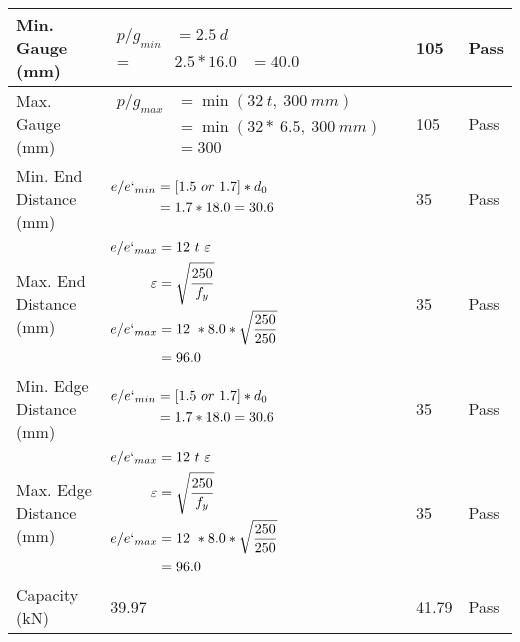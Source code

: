 \documentclass{article}%
\begin{document}
\begin{longtable}{|p{4cm}|p{5cm}|p{5.5cm}|p{1.5cm}|}
\hline%
Min. Gauge (mm)&$\begin{aligned}p/g_{min}&= 2.5 ~ d&\\ =&2.5*16.0&=40.0\end{aligned}$&105&Pass\\%
\hline%
Max. Gauge (mm)&$\begin{aligned}p/g_{max} &=\min(32~t,~300~mm)&\\ &=\min(32 *~6.5,~ 300 ~mm)\\&=300\end{aligned}$&105&Pass\\%
\hline%
Min. End Distance (mm)&$\begin{aligned}e/e`_{min} &=[1.5~or~ 1.7] * d_0\\ &=1.7*18.0=30.6 \end{aligned}$&35&Pass\\%
\hline%
Max. End Distance (mm)&$\begin{aligned}e/e`_{max} &= 12~ t~ \varepsilon&\\ \varepsilon &= \sqrt{\frac{250}{f_y}}\\ e/e`_{max}&=12 ~*8.0*\sqrt{\frac{250}{250}}\\ &=96.0\\ \end{aligned}$&35&Pass\\%
\hline%
Min. Edge Distance (mm)&$\begin{aligned}e/e`_{min} &=[1.5~or~ 1.7] * d_0\\ &=1.7*18.0=30.6 \end{aligned}$&35&Pass\\%
\hline%
Max. Edge Distance (mm)&$\begin{aligned}e/e`_{max} &= 12~ t~ \varepsilon&\\ \varepsilon &= \sqrt{\frac{250}{f_y}}\\ e/e`_{max}&=12 ~*8.0*\sqrt{\frac{250}{250}}\\ &=96.0\\ \end{aligned}$&35&Pass\\%
\hline%
Capacity (kN)&39.97&41.79&Pass\\%
\hline%
\end{longtable}

%
\newpage%
\end{document}
